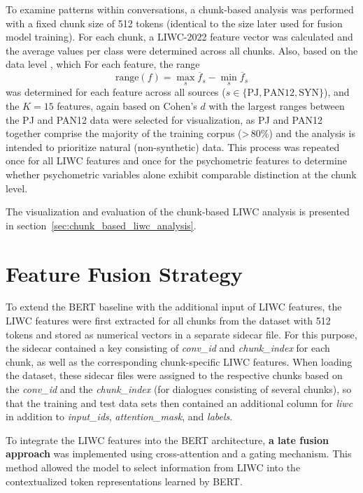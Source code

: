 To examine patterns within conversations, a chunk-based analysis was performed with a fixed chunk size of 512 tokens (identical to the size later used for fusion model training). For each chunk, a LIWC-2022 feature vector was calculated and the average values per class were determined across all chunks. Also, based on the data level , which
For each feature, the range
\[
\mathrm{range}(f) = \max_{s}\overline{f}_{s} - \min_{s}\overline{f}_ {s}
\]
was determined for each feature across all sources (\(s \in \{\mathrm{PJ}, \mathrm{PAN12}, \mathrm{SYN}\}\)), and the \(K=15\) features, again based on Cohen's \(d\) \cite{cohen1988} with the largest ranges between the PJ and PAN12 data were selected for visualization, as PJ and PAN12 together comprise the majority of the training corpus (>\,80\%) and the analysis is intended to prioritize natural (non-synthetic) data.  This process was repeated once for all LIWC features and once for the psychometric features to determine whether psychometric variables alone exhibit comparable distinction at the chunk level.

The visualization and evaluation of the chunk-based LIWC analysis is presented in section~\ref{sec:chunk_based_liwc_analysis}.

\section{Feature Fusion Strategy}


To extend the BERT baseline with the additional input of LIWC features, the LIWC features were first extracted for all chunks from the dataset with 512 tokens and stored as numerical vectors in a separate sidecar file.  For this purpose, the sidecar contained a key consisting of \textit{conv\_id} and \textit{chunk\_index} for each chunk, as well as the corresponding chunk-specific LIWC features. 
When loading the dataset, these sidecar files were assigned to the respective chunks based on the \textit{conv\_id} and the \textit{chunk\_index} (for dialogues consisting of several chunks), so that the training and test data sets then contained an additional column for \textit{liwc} in addition to \textit{input\_ids}, \textit{attention\_mask}, and \textit{labels}. \newline

To integrate the LIWC features into the BERT architecture, \textbf{a late fusion approach} was implemented using cross-attention and a gating mechanism. This method allowed the model to select information from LIWC into the contextualized token representations learned by BERT. 

